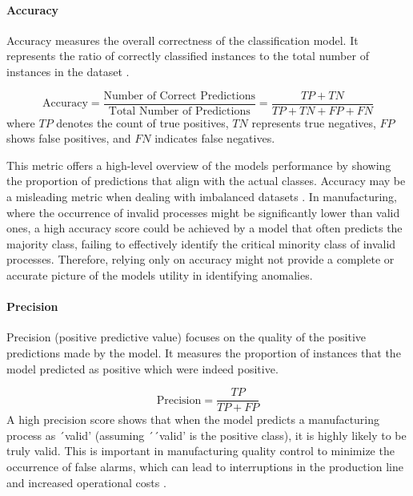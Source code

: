 \paragraph{\textbf{Accuracy}}
Accuracy measures the overall correctness of the classification model. It represents the ratio of correctly classified instances to the total number of instances in the dataset \autocite{fahrmeir2016statistik}.


\begin{equation}
    \label{eq:accuracy}
    \text{Accuracy} = \frac{\text{Number of Correct Predictions}}{\text{Total Number of Predictions}} = \frac{TP + TN}{TP + TN + FP + FN}
\end{equation}
where $TP$ denotes the count of true positives, $TN$ represents true negatives, $FP$ shows false positives, and $FN$ indicates false negatives.

This metric offers a high-level overview of the models performance by showing the proportion of predictions that align with the actual classes. Accuracy may be a misleading metric when dealing with imbalanced datasets \autocite{fahrmeir2016statistik}. In manufacturing, where the occurrence of invalid processes might be significantly lower than valid ones, a high accuracy score could be achieved by a model that often predicts the majority class, failing to effectively identify the critical minority class of invalid processes. Therefore, relying only on accuracy might not provide a complete or accurate picture of the models utility in identifying anomalies.

\paragraph{\textbf{Precision}}
Precision (positive predictive value) focuses on the quality of the positive predictions made by the model. It measures the proportion of instances that the model predicted as positive which were indeed positive.

\begin{equation}
    \label{eq:precision}
    \text{Precision} = \frac{TP}{TP + FP}
\end{equation}
A high precision score shows that when the model predicts a manufacturing process as ´valid' (assuming ´´valid' is the positive class), it is highly likely to be truly valid. This is important in manufacturing quality control to minimize the occurrence of false alarms, which can lead to interruptions in the production line and increased operational costs \autocite{kharitonov2022comparative}.

